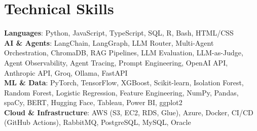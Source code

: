 \documentclass[letterpaper,10.5pt]{article}
\begin{document}
\section{Technical Skills}
\vspace{-7pt}
\begin{itemize}[leftmargin=0.15in, label={}]\small{\item{
  \textbf{Languages}{: Python, JavaScript, TypeScript, SQL, R, Bash, HTML/CSS} \\
  \textbf{AI \& Agents}{: LangChain, LangGraph, LLM Router, Multi-Agent Orchestration, ChromaDB, RAG Pipelines, LLM Evaluation, LLM-as-Judge, Agent Observability, Agent Tracing, Prompt Engineering, OpenAI API, Anthropic API, Groq, Ollama, FastAPI} \\
  \textbf{ML \& Data}{: PyTorch, TensorFlow, XGBoost, Scikit-learn, Isolation Forest, Random Forest, Logistic Regression, Feature Engineering, NumPy, Pandas, spaCy, BERT, Hugging Face, Tableau, Power BI, ggplot2} \\
  \textbf{Cloud \& Infrastructure}{: AWS (S3, EC2, RDS, Glue), Azure, Docker, CI/CD (GitHub Actions), RabbitMQ, PostgreSQL, MySQL, Oracle}
}}
\end{itemize}
\end{document}
